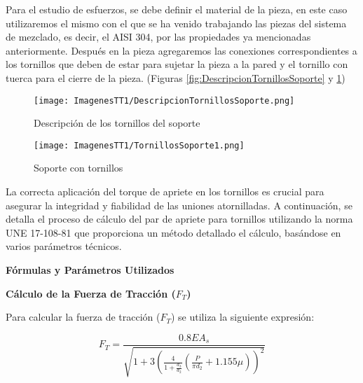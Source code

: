\documentclass[14pt,oneside]{extarticle} %
\begin{document}
Para el estudio de esfuerzos, se debe definir el material de la pieza, en este caso utilizaremos el mismo con el que se ha venido trabajando las piezas del sistema de mezclado, es decir, el AISI 304, por las propiedades ya mencionadas anteriormente. Después en la pieza agregaremos las conexiones correspondientes a los tornillos que deben de estar para sujetar la pieza a la pared y el tornillo con tuerca para el cierre de la pieza. (Figuras \ref{fig:DescripcionTornillosSoporte} y \ref{fig:TornillosSoporte1})

\begin{figure}[H]
  \centering
  \begin{minipage}{0.4\textwidth}
    \centering
    \texttt{[image: ImagenesTT1/DescripcionTornillosSoporte.png]}
    \caption{Descripción de los tornillos del soporte}
    \label{fig:DescripcionTornillosSoporte}
  \end{minipage}%
  \begin{minipage}{0.4\textwidth}
    \centering
    \texttt{[image: ImagenesTT1/TornillosSoporte1.png]}
    \caption{Soporte con tornillos}
    \label{fig:TornillosSoporte1}
  \end{minipage}
\end{figure}

La correcta aplicación del torque de apriete en los tornillos es crucial para asegurar la integridad y fiabilidad de las uniones atornilladas. A continuación, se detalla el proceso de cálculo del par de apriete para tornillos  utilizando la norma UNE 17-108-81 que proporciona un método detallado el cálculo, basándose en varios parámetros técnicos.

\newpage

\textbf{Fórmulas y Parámetros Utilizados}

\textbf{Cálculo de la Fuerza de Tracción (\( F_T \))}

Para calcular la fuerza de tracción (\( F_T \)) se utiliza la siguiente expresión:

\begin{equation} \label{eq:FT}
F_T = \frac{0.8 E A_s}{\sqrt{1 + 3 \left( \frac{4}{1 + \frac{d_3}{d_2}} \left( \frac{P}{\pi d_2} + 1.155 \mu \right) \right)^2}}
\end{equation}
\end{document}
